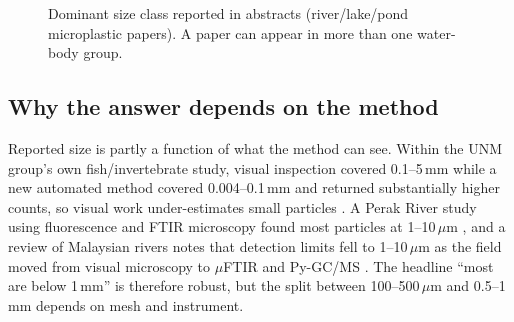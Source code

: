 \documentclass[11pt,a4paper]{article}
\newcommand{\um}{\,\ensuremath{\mu}m}
\begin{document}
\begin{figure}[H]\centering
{}
\caption{Dominant size class reported in abstracts (river/lake/pond microplastic papers). A paper can appear in more than one water-body group.}\label{fig:bars}
\end{figure}

\subsection{Why the answer depends on the method}
Reported size is partly a function of what the method can see. Within the UNM group's own fish/invertebrate study, visual inspection covered 0.1--5\,mm while a new automated method covered 0.004--0.1\,mm and returned substantially higher counts, so visual work under-estimates small particles \cite{ng24}. A Perak River study using fluorescence and FTIR microscopy found most particles at 1--10\um{} \cite{hassan25}, and a review of Malaysian rivers notes that detection limits fell to 1--10\um{} as the field moved from visual microscopy to $\mu$FTIR and Py-GC/MS \cite{bouida26}. The headline ``most are below 1\,mm'' is therefore robust, but the split between 100--500\um{} and 0.5--1\,mm depends on mesh and instrument.
\end{document}
